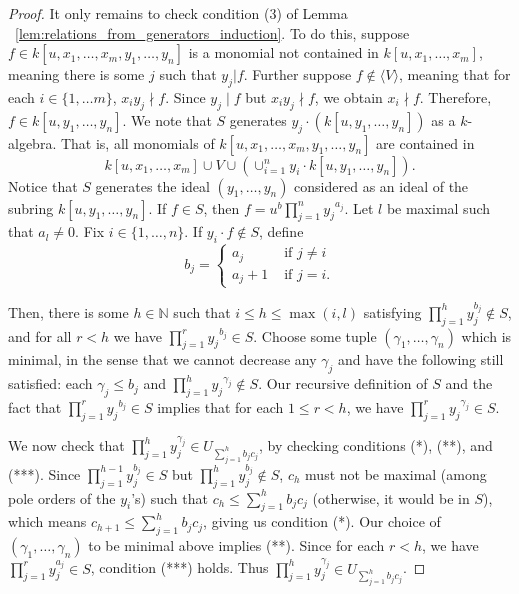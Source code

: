 \documentclass{amsart}
\theoremstyle{plain}
\theoremstyle{definition}
\theoremstyle{remark}
\numberwithin{equation}{section}
\newcommand\BN{{\mathbb N}}
\begin{document}
\begin{proof}
It only remains to check condition (3) of Lemma ~\ref{lem:relations_from_generators_induction}. To do this, suppose $f\in k[u, x_1, \ldots, x_m, y_1, \ldots, y_n]$ is a monomial not contained in $k[u, x_1, \ldots, x_m]$, meaning there is some $j$ such that $y_j|f$.  Further suppose $f\not\in \langle V \rangle$, meaning that for each $i\in \{1, \ldots m\}$, $x_iy_j \nmid f$. Since $y_j \mid f$ but $x_iy_j \nmid f$, we obtain $x_i\nmid f$.  Therefore, $f\in k[u, y_1, \ldots, y_n]$.  We note that $S$ generates $y_j \cdot (k[u,y_1, \ldots, y_n])$ as a $k$-algebra.  That is, all monomials of $k[u, x_1, \ldots, x_m, y_1, \ldots, y_n]$ are contained in
\[
	k[u, x_1, \ldots, x_m] \cup V \cup \left(\cup_{i=1}^n y_i \cdot k[u, y_1, \ldots, y_n]\right). 
\]
Notice that $S$ generates the ideal $(y_1, \ldots, y_n)$ considered as an ideal of the subring $k[u, y_1, \ldots, y_n]$.  If $f\in S$, then $f=u^b \prod_{j=1}^n {y_j}^{a_j}$. Let $l$ be maximal such that $a_l\ne 0$.
Fix $i \in \{1, \ldots, n\}$. If $y_i \cdot f \notin S$, define
$$
b_j = \begin{cases}
	a_j &\text{ if } j \neq i\\
	a_j + 1 &\text{ if } j=i.
\end{cases}$$

\noindent
Then, there is some $h \in \BN$ such that $i\le h\le \max(i,l)$ satisfying $\prod_{j=1}^h y_j^{b_j}\not\in S$, 
and for all $r<h$ we have $\prod_{j=1}^r {y_j}^{b_j}\in S$.  
Choose some tuple $(\gamma_1, \ldots, \gamma_n)$ which is minimal, in the sense that we cannot decrease any $\gamma_j$ 
and have the following still satisfied: each $\gamma_j\le b_j$ 
and $\prod_{j=1}^h {y_j}^{\gamma_j}\not\in S.$ Our recursive definition of 
$S$ and the fact that $\prod_{j=1}^r {y_j}^{b_j}\in S$ implies that for each $1\le r< h$, we have $\prod_{j=1}^r {y_j}^{\gamma_j}\in S$.

We now check that $\prod_{j=1}^h y_j^{\gamma_j}\in U_{\sum_{j=1}^h b_j c_j}$, by checking conditions (*), (**), and (***).  Since $\prod_{j=1}^{h-1} y_j^{b_j}\in S$ but $\prod_{j=1}^h y_j^{b_j}\not\in S$, $c_h$ must not be maximal (among pole orders of the $y_i$'s) such that $c_h \le \sum_{j=1}^h b_jc_j$ (otherwise, it would be in $S$), which means $c_{h+1}\le \sum_{j=1}^h b_jc_j$, giving us condition (*).  Our choice of $(\gamma_1, \ldots, \gamma_n)$ to be minimal above implies (**).  Since for each $r<h$, we have $\prod_{j=1}^r y_{j}^{a_j}\in S$, condition (***) holds.  Thus $\prod_{j=1}^h y_j^{\gamma_j}\in U_{\sum_{j=1}^h b_j c_j}$.


\end{proof}
\end{document}
